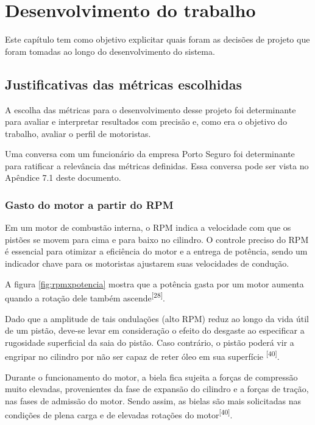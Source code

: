 \chapter{Desenvolvimento do trabalho}


Este capítulo tem como objetivo explicitar quais foram as decisões de projeto que foram tomadas ao longo do desenvolvimento do sistema.

\section{Justificativas das métricas escolhidas}

A escolha das métricas para o desenvolvimento desse projeto foi determinante para avaliar e interpretar resultados com precisão e, como era o objetivo do trabalho, avaliar o perfil de motoristas.

Uma conversa com um funcionário da empresa Porto Seguro foi determinante para ratificar a relevância das métricas definidas. Essa conversa pode ser vista no Apêndice 7.1 deste documento.

\subsection{Gasto do motor a partir do RPM}

Em um motor de combustão interna, o RPM indica a velocidade com que os pistões se movem para cima e para baixo no cilindro. O controle preciso do RPM é essencial para otimizar a eficiência do motor e a entrega de potência, sendo um indicador chave para os motoristas ajustarem suas velocidades de condução.

A figura \ref{fig:rpmxpotencia} mostra que a potência gasta por um motor aumenta quando a rotação dele também ascende\textsuperscript{[28]}. 
 
Dado que a amplitude de tais ondulações (alto RPM) reduz ao longo da vida útil de um pistão, deve-se levar em consideração o efeito do desgaste ao especificar a rugosidade superficial da saia do pistão. Caso contrário, o pistão poderá vir a engripar no cilindro por não ser capaz
de reter óleo em sua superfície \textsuperscript{[40]}.

Durante o funcionamento do motor, a biela fica sujeita a forças de compressão muito elevadas, provenientes da fase de expansão do cilindro e a forças de tração, nas fases de admissão do motor. Sendo assim, as bielas são mais solicitadas nas condições de plena carga e de elevadas rotações do motor\textsuperscript{[40]}.


